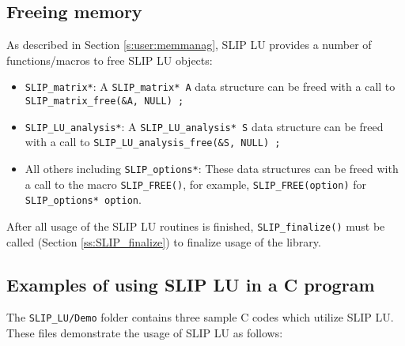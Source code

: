 \documentclass[12pt]{article}
\theoremstyle{definition}
\begin{document}
\cprotect\subsection{Freeing memory}
\label{s:Using:free}

As described in Section \ref{s:user:memmanag}, SLIP LU provides a number
of functions/macros to free SLIP LU objects:

\begin{itemize}
\item \verb|SLIP_matrix*|: A \verb|SLIP_matrix* A| data structure can be freed
with a call to \verb|SLIP_matrix_free(&A, NULL) ;|

\item \verb|SLIP_LU_analysis*|: A \verb|SLIP_LU_analysis* S| data structure can
be freed with a call to \verb|SLIP_LU_analysis_free(&S, NULL) ;|

\item All others including \verb|SLIP_options*|: These data structures can be
freed with a call to the macro \verb|SLIP_FREE()|, for example,
\verb|SLIP_FREE(option)| for \newline
\verb|SLIP_options* option|.

\end{itemize}

After all usage of the SLIP LU routines is finished, \verb|SLIP_finalize()|
must be called (Section \ref{ss:SLIP_finalize}) to finalize usage of the
library.

\cprotect\subsection{Examples of using SLIP LU in a C program}
\label{s:Using:Examples}

The \verb|SLIP_LU/Demo| folder contains three sample C codes which utilize SLIP
LU. These files demonstrate the usage of SLIP LU as follows:
\end{document}
